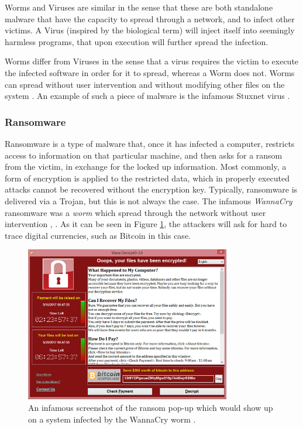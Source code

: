 Worms and Viruses are similar in the sense that these are both standalone malware that have the capacity to spread through a network, and to infect other victims. A Virus (inspired by the biological term) will inject itself into seemingly harmless programs, that upon execution will further spread the infection. 

Worms differ from Viruses in the sense that a virus requires the victim to execute the infected software in order for it to spread, whereas a Worm does not. Worms can spread without user intervention and without modifying other files on the system \cite{wiki_malware}. An example of such a piece of malware is the infamous Stuxnet virus \cite{stuxnet}.

\subsubsection{Ransomware}

Ransomware is a type of malware that, once it has infected a computer, restricts access to information on that particular machine, and then asks for a ransom from the victim, in exchange for the locked up information. Most commonly, a form of encryption is applied to the restricted data, which in properly executed attacks cannot be recovered without the encryption key. Typically, ransomware is delivered via a Trojan, but this is not always the case. The infamous \emph{WannaCry} ransomware was a \emph{worm} which spread through the network without user intervention \cite{wiki_wannacry}, \cite{wiki_ransomware}. As it can be seen in Figure \ref{fig:wannacry}, the attackers will ask for hard to trace digital currencies, such as Bitcoin in this case.

\begin{figure}[h]
    \centering
    \includegraphics[width=0.8\textwidth]{./images/wanacry.png}
    \caption{An infamous screenshot of the ransom pop-up which would show up on a system infected by the WannaCry worm \cite{wiki_wannacry}.}
    \label{fig:wannacry}
\end{figure}

